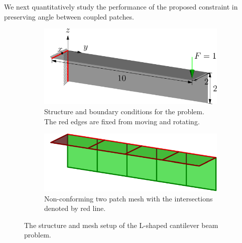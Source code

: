 \documentclass[preprint,12pt]{elsarticle}
\theoremstyle{remark}
\begin{document}
We next quantitatively study the performance of the proposed constraint in preserving angle between coupled patches. 
\begin{figure}[!hbt]
    \centering
    \captionsetup[subfigure]{font = footnotesize}
    \begin{subfigure}[b]{.48\textwidth}
        \centering
        \includegraphics[width = \textwidth]{L-beam-config}
        \caption{Structure and boundary conditions for the problem. The red edges are fixed from moving and rotating.}\label{fig:L-beam}
    \end{subfigure}
    \begin{subfigure}[b]{.48\textwidth}
        \centering
        \includegraphics[width = \textwidth]{L-beam-decompose}
        \caption{Non-conforming two patch mesh with the intersections denoted by red line.}\label{fig:L-beam-decompose}
    \end{subfigure}
	\caption{The structure and mesh setup of the L-shaped cantilever beam problem.}
\end{figure}
\end{document}
